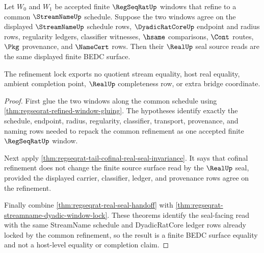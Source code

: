 \begin{theorem}
\label{thm:regseqrat-streamname-dyadic-seal-refinement-lock}
Let $W_0$ and $W_1$ be accepted finite $\RegSeqRatUp$ windows that refine to a
common $\StreamNameUp$ schedule. Suppose the two windows agree on the displayed
$\StreamNameUp$ schedule rows, $\DyadicRatCoreUp$ endpoint and radius rows,
regularity ledgers, classifier witnesses, $\hsame$ comparisons, $\Cont$ routes,
$\Pkg$ provenance, and $\NameCert$ rows. Then their $\RealUp$ seal source reads
are the same displayed finite BEDC surface.

The refinement lock exports no quotient stream equality, host real equality,
ambient completion point, $\RealUp$ completeness row, or extra bridge
coordinate.
\end{theorem}
\begin{proof}
First glue the two windows along the common schedule using
\autoref{thm:regseqrat-refined-window-gluing}. The hypotheses identify exactly
the schedule, endpoint, radius, regularity, classifier, transport, provenance,
and naming rows needed to repack the common refinement as one accepted finite
$\RegSeqRatUp$ window.

Next apply \autoref{thm:regseqrat-tail-cofinal-real-seal-invariance}. It says
that cofinal refinement does not change the finite source surface read by the
$\RealUp$ seal, provided the displayed carrier, classifier, ledger, and
provenance rows agree on the refinement.

Finally combine \autoref{thm:regseqrat-real-seal-handoff} with
\autoref{thm:regseqrat-streamname-dyadic-window-lock}. These theorems identify
the seal-facing read with the same StreamName schedule and DyadicRatCore ledger
rows already locked by the common refinement, so the result is a finite BEDC
surface equality and not a host-level equality or completion claim.
\end{proof}

